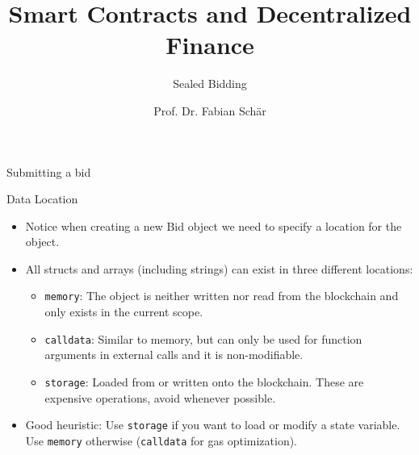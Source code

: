\documentclass[]{beamer}
\title{Smart Contracts and Decentralized Finance}
\subtitle{Sealed Bidding}
\author{Prof. Dr. Fabian Sch\"ar}
\institute{University of Basel}
\begin{document}
\thispagestyle{empty}
\begin{frame}[noframenumbering]
	\titlepage
\end{frame}

\begin{frame}{Submitting a bid}
\vspace{.3cm}

\end{frame}

\begin{frame}{Data Location}
	\begin{itemize}
		\item Notice when creating a new Bid object we need to specify a location for the object.
		\item<2-> All structs and arrays (including strings) can exist in three different locations:
			\begin{itemize}
			\item<3-> \texttt{memory}: The object is neither written nor read from the blockchain and only exists in the current scope.
			\item<4-> \texttt{calldata}: Similar to memory, but can only be used for function arguments in external calls and it is non-modifiable.
			\item<5-> \texttt{storage}: Loaded from or written onto the blockchain. These are expensive operations, avoid whenever possible.
			\end{itemize}

		\item<6-> Good heuristic: Use \texttt{storage} if you want to load or modify a state variable. Use \texttt{memory} otherwise (\texttt{calldata} for gas optimization).
		\end{itemize}
\end{frame}
\end{document}
